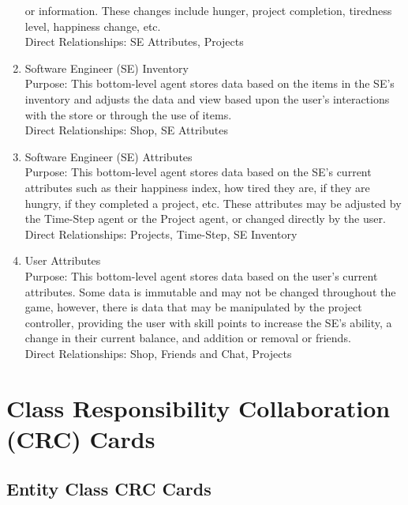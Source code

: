 \documentclass[]{article}
\begin{document}
\begin{enumerate}
    or information. These changes include hunger, project completion, tiredness 
    level, happiness change, etc.\\
    Direct Relationships: SE Attributes, Projects
    \item Software Engineer (SE) Inventory\\
    Purpose: This bottom-level agent stores data based on the items in the SE’s 
    inventory and adjusts the data and view based upon the user’s interactions 
    with the store or through the use of items.\\
    Direct Relationships: Shop, SE Attributes
    \item Software Engineer (SE) Attributes\\
    Purpose: This bottom-level agent stores data based on the SE’s current 
    attributes such as their happiness index, how tired they are, if they are 
    hungry, if they completed a project, etc. These attributes may be adjusted 
    by the Time-Step agent or the Project agent, or changed directly by the 
    user.\\
    Direct Relationships: Projects, Time-Step, SE Inventory
    \item User Attributes\\
    Purpose: This bottom-level agent stores data based on the user’s current 
    attributes. Some data is immutable and may not be changed throughout the 
    game, however, there is data that may be manipulated by the project 
    controller, providing the user with skill points to increase the SE’s 
    ability, a change in their current balance, and addition or removal or 
    friends.\\
    Direct Relationships: Shop, Friends and Chat, Projects
\end{enumerate}
	
\section{Class Responsibility Collaboration (CRC) Cards}
\label{sec:class_responsibility_collaboration_crc_cards}
\subsection{Entity Class CRC Cards}
\label{sec:entity_class_CRC_cards}
\end{document}

